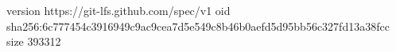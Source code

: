 version https://git-lfs.github.com/spec/v1
oid sha256:6c777454c3916949c9ac9cea7d5e549c8b46b0aefd5d95bb56c327fd13a38fcc
size 393312
